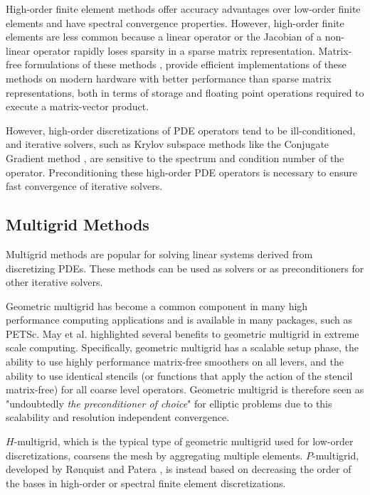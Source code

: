 High-order finite element methods offer accuracy advantages over low-order finite elements \cite{demkowicz1989toward, oden1989toward, rachowicz1989toward} and have spectral convergence properties.
However, high-order finite elements are less common because a linear operator or the Jacobian of a non-linear operator rapidly loses sparsity in a sparse matrix representation.
Matrix-free formulations of these methods \cite{brown2010efficient, deville2002highorder, knoll2004jacobian}, provide efficient implementations of these methods on modern hardware \cite{libceed-user-manual, fischer2020scalability, kronbichler2019multigrid} with better performance than sparse matrix representations, both in terms of storage and floating point operations required to execute a matrix-vector product.

However, high-order discretizations of PDE operators tend to be ill-conditioned, and iterative solvers, such as Krylov subspace methods like the Conjugate Gradient method \cite{hestenes1952methods, shewchuk1994introduction}, are sensitive to the spectrum and condition number of the operator.
Preconditioning these high-order PDE operators is necessary to ensure fast convergence of iterative solvers.

\subsection{Multigrid Methods}

Multigrid methods \cite{brandt1982guide, briggs2000multigrid, stuben1982multigrid} are popular for solving linear systems derived from discretizing PDEs.
These methods can be used as solvers or as preconditioners for other iterative solvers.

Geometric multigrid has become a common component in many high performance computing applications and is available in many packages, such as PETSc.
May et al. \cite{may2016extreme} highlighted several benefits to geometric multigrid in extreme scale computing.
Specifically, geometric multigrid has a scalable setup phase, the ability to use highly performance matrix-free smoothers on all levers, and the ability to use identical stencils (or functions that apply the action of the stencil matrix-free) for all coarse level operators.
Geometric multigrid is therefore seen as "undoubtedly {\textit{the preconditioner of choice}}" for elliptic problems due to this scalability and resolution independent convergence.

$H$-multigrid, which is the typical type of geometric multigrid used for low-order discretizations, coarsens the mesh by aggregating multiple elements.
$P$-multigrid, developed by R{\o}nquist and Patera \cite{ronquist1987spectral}, is instead based on decreasing the order of the bases in high-order or spectral finite element discretizations.

